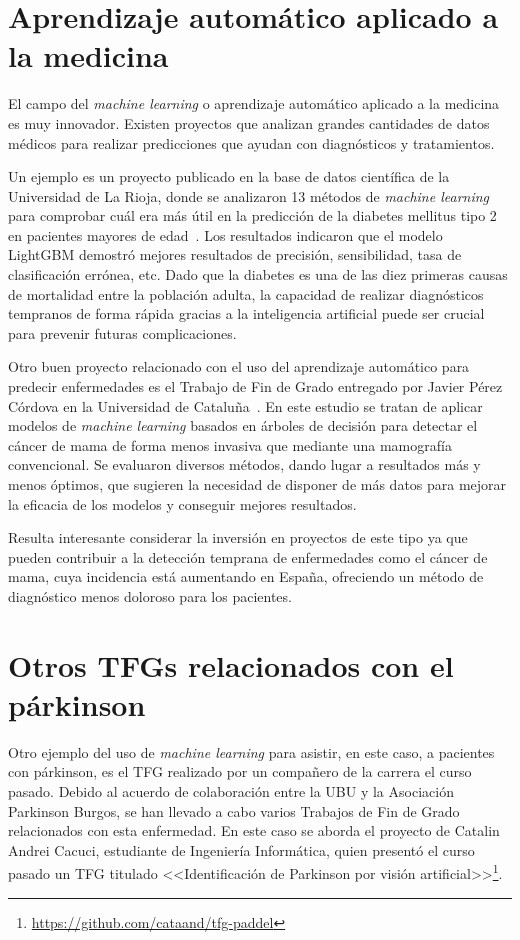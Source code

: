 \section{Aprendizaje automático aplicado a la medicina}
El campo del \textit{machine learning} o aprendizaje automático aplicado a la medicina es muy innovador. Existen proyectos que analizan grandes cantidades de datos médicos para realizar predicciones que ayudan con diagnósticos y tratamientos.

Un ejemplo es un proyecto publicado en la base de datos científica de la Universidad de La Rioja, donde se analizaron 13 métodos de \textit{machine learning} para comprobar cuál era más útil en la predicción de la diabetes mellitus tipo 2 en pacientes mayores de edad~\cite{prediccionDiabetes}. Los resultados indicaron que el modelo LightGBM demostró mejores resultados de precisión, sensibilidad, tasa de clasificación errónea, etc. Dado que la diabetes es una de las diez primeras causas de mortalidad entre la población adulta, la capacidad de realizar diagnósticos tempranos de forma rápida gracias a la inteligencia artificial puede ser crucial para prevenir futuras complicaciones.

Otro buen proyecto relacionado con el uso del aprendizaje automático para predecir enfermedades es el Trabajo de Fin de Grado entregado por Javier Pérez Córdova en la Universidad de Cataluña~\cite{perez2021tecnicas}. En este estudio se tratan de aplicar modelos de \textit{machine learning} basados en árboles de decisión para detectar el cáncer de mama de forma menos invasiva que mediante una mamografía convencional. Se evaluaron diversos métodos, dando lugar a resultados más y menos óptimos, que sugieren la necesidad de disponer de más datos para mejorar la eficacia de los modelos y conseguir mejores resultados.

Resulta interesante considerar la inversión en proyectos de este tipo ya que pueden contribuir a la detección temprana de enfermedades como el cáncer de mama, cuya incidencia está aumentando en España, ofreciendo un método de diagnóstico menos doloroso para los pacientes.



\section{Otros TFGs relacionados con el párkinson}
Otro ejemplo del uso de \textit{machine learning} para asistir, en este caso, a pacientes con párkinson, es el TFG realizado por un compañero de la carrera el curso pasado. Debido al acuerdo de colaboración entre la UBU y la Asociación Parkinson Burgos, se han llevado a cabo varios Trabajos de Fin de Grado relacionados con esta enfermedad. En este caso se aborda el proyecto de Catalin Andrei Cacuci, estudiante de Ingeniería Informática, quien presentó el curso pasado un TFG titulado <<Identificación de Parkinson por visión artificial>>\footnote{\url{https://github.com/cataand/tfg-paddel}}.

